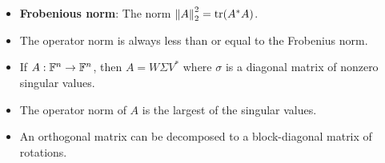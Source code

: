 \documentclass[../../notes.tex]{subfiles}
\begin{document}
\begin{itemize}
\begin{itemize}
    \end{itemize}
    \item \textbf{Frobenious norm}: The norm $\norm{A}_2^2=\trace(A^*A)$.
    \item The operator norm is always less than or equal to the Frobenius norm.
    \item If $A:\mathbb{F}^n\to\mathbb{F}^n$, then $A=W\Sigma V^*$ where $\sigma$ is a diagonal matrix of nonzero singular values.
    \item The operator norm of $A$ is the largest of the singular values.
    \item An orthogonal matrix can be decomposed to a block-diagonal matrix of rotations.
\end{itemize}
\end{document}

